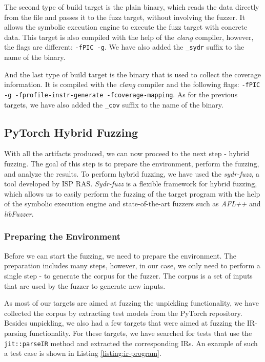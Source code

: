 
The second type of build target is the plain binary, which reads the data directly from the file and passes it to the fuzz target, without involving the fuzzer. It allows the symbolic execution engine to execute the fuzz target with concrete data. This target is also compiled with the help of the \textit{clang} compiler, however, the flags are different: \texttt{-fPIC -g}. We have also added the \texttt{\_sydr} suffix to the name of the binary.


And the last type of build target is the binary that is used to collect the coverage information. It is compiled with the \textit{clang} compiler and the following flags: \texttt{-fPIC -g -fprofile-instr-generate -fcoverage-mapping}. As for the previous targets, we have also added the \texttt{\_cov} suffix to the name of the binary.

\subsection{PyTorch Hybrid Fuzzing}

With all the artifacts produced, we can now proceed to the next step - hybrid fuzzing. The goal of this step is to prepare the environment, perform the fuzzing, and analyze the results. To perform hybrid fuzzing, we have used the \textit{sydr-fuzz}, a tool developed by ISP RAS. \textit{Sydr-fuzz} is a flexible framework for hybrid fuzzing, which allows us to easily perform the fuzzing of the target program with the help of the symbolic execution engine and state-of-the-art fuzzers such as \textit{AFL++} and \textit{libFuzzer}.

\subsubsection{Preparing the Environment}

Before we can start the fuzzing, we need to prepare the environment. The preparation includes many steps, however, in our case, we only need to perform a single step - to generate the corpus for the fuzzer. The corpus is a set of inputs that are used by the fuzzer to generate new inputs.

As most of our targets are aimed at fuzzing the unpickling functionality, we have collected the corpus by extracting test models from the PyTorch repository. Besides unpickling, we also had a few targets that were aimed at fuzzing the IR-parsing functionality. For these targets, we have searched for tests that use the \texttt{jit::parseIR} method and extracted the corresponding IRs. An example of such a test case is shown in Listing \ref{listing:ir-program}.

